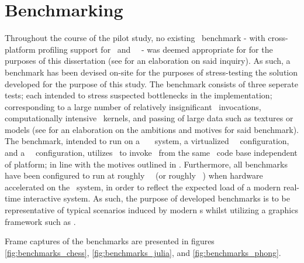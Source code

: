 \section{Benchmarking}
\label{sec:methodologyexperiment_benchmarking}
Throughout the course of the pilot study, no existing \dvttermopenglestwopointo\ benchmark - with cross-platform profiling support for \dvttermandroid\ and \dvttermxeleven\ \dvttermlinux\ - was deemed appropriate for for the purposes of this dissertation (see  for an elaboration on said inquiry).
As such, a benchmark has been devised on-site for the purposes of stress-testing the solution developed for the purpose of this study.
The benchmark consists of three seperate tests; each intended to stress suspected bottlenecks in the implementation; corresponding to a large number of relatively insignificant \dvttermopengl\ invocations, computationally intensive \dvttermgpu\ kernels, and passing of large data such as textures or models (see  for an elaboration on the ambitions and motives for said benchmark).
The benchmark, intended to run on a \dvttermhost\ \dvttermfedora\ \dvttermlinux\ system, a virtualized \dvttermsimics\ \dvttermfedora\ configuration, and a \dvttermqemu\ \dvttermandroid\ configuration, utilizes \dvttermjni\ to invoke \dvttermopengles\ from the same \dvttermc\ code base independent of platform; in line with the motives outlined in .
Furthermore, all benchmarks have been configured to run at roughly ~\milli\second\ (or roughly ~\dvttermfps ) when hardware accelerated on the \dvttermhost\ system, in order to reflect the expected load of a modern real-time interactive system.
As such, the purpose of developed benchmarks is to be representative of typical scenarios induced by modern \dvttermgui s whilst utilizing a graphics framework such as \dvttermopengl .

Frame captures of the benchmarks are presented in figures \ref{fig:benchmarks_chess}, \ref{fig:benchmarks_julia}, and \ref{fig:benchmarks_phong}.




